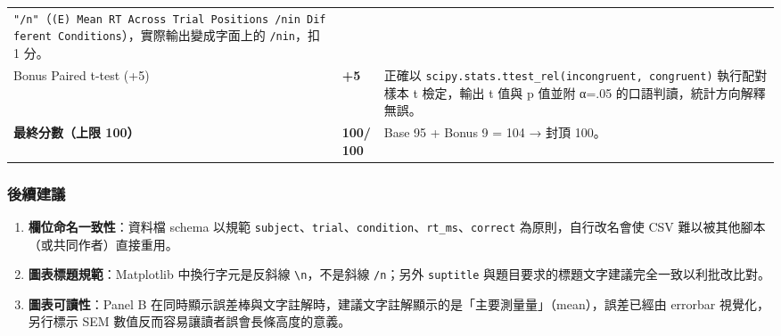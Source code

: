 \documentclass[
  14pt,
]{extarticle}
\providecommand{\tightlist}{%
  \setlength{\itemsep}{0pt}\setlength{\parskip}{0pt}}
\begin{document}
\begin{longtable}[]{@{}lll@{}}
\begin{minipage}[t]{0.77\columnwidth}
\texttt{"/n"}（\texttt{\textquotesingle{}(E)\ Mean\ RT\ Across\ Trial\ Positions\ /nin\ Different\ Conditions\textquotesingle{}}），實際輸出變成字面上的
\texttt{/nin}，扣 1 分。\strut
\end{minipage}\tabularnewline
\begin{minipage}[t]{0.10\columnwidth}\raggedright
Bonus Paired t-test (+5)\strut
\end{minipage} & \begin{minipage}[t]{0.04\columnwidth}\raggedright
\textbf{+5}\strut
\end{minipage} & \begin{minipage}[t]{0.77\columnwidth}\raggedright
正確以 \texttt{scipy.stats.ttest\_rel(incongruent,\ congruent)}
執行配對樣本 t 檢定，輸出 t 值與 p 值並附 α=.05
的口語判讀，統計方向解釋無誤。\strut
\end{minipage}\tabularnewline
\begin{minipage}[t]{0.10\columnwidth}\raggedright
\textbf{最終分數（上限 100）}\strut
\end{minipage} & \begin{minipage}[t]{0.04\columnwidth}\raggedright
\textbf{100/100}\strut
\end{minipage} & \begin{minipage}[t]{0.77\columnwidth}\raggedright
Base 95 + Bonus 9 = 104 → 封頂 100。\strut
\end{minipage}\tabularnewline
\bottomrule
\end{longtable}

\hypertarget{ux5f8cux7e8cux5efaux8b70}{%
\subsubsection{後續建議}\label{ux5f8cux7e8cux5efaux8b70}}

\begin{enumerate}
\def\labelenumi{\arabic{enumi}.}
\tightlist
\item
  \textbf{欄位命名一致性}：資料檔 schema 以規範
  \texttt{subject}、\texttt{trial}、\texttt{condition}、\texttt{rt\_ms}、\texttt{correct}
  為原則，自行改名會使 CSV 難以被其他腳本（或共同作者）直接重用。
\item
  \textbf{圖表標題規範}：Matplotlib 中換行字元是反斜線
  \texttt{\textbackslash{}n}，不是斜線 \texttt{/n}；另外
  \texttt{suptitle} 與題目要求的標題文字建議完全一致以利批改比對。
\item
  \textbf{圖表可讀性}：Panel B
  在同時顯示誤差棒與文字註解時，建議文字註解顯示的是「主要測量量」（mean），誤差已經由
  errorbar 視覺化，另行標示 SEM 數值反而容易讓讀者誤會長條高度的意義。
\end{enumerate}
\end{document}
